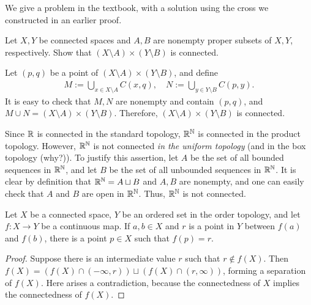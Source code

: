 We give a problem in the textbook, with a solution using the cross we constructed in an earlier proof.
\begin{prob}
    Let $X, Y$ be connected spaces and $A, B$ are nonempty proper subsets of $X, Y$, respectively.
    Show that $(X\setminus A)\times(Y\setminus B)$ is connected.
\end{prob}
\begin{sol}
    Let $(p, q)$ be a point of $(X\setminus A)\times(Y\setminus B)$, and define
    \begin{align*}
        M:=\bigcup_{x\in X\setminus A}C(x, q),\quad N:=\bigcup_{y\in Y\setminus B}C(p, y).
    \end{align*}
    It is easy to check that $M, N$ are nonempty and contain $(p, q)$, and $M\cup N=(X\setminus A)\times(Y\setminus B)$.
    Therefore, $(X\setminus A)\times(Y\setminus B)$ is connected.
\end{sol}

\begin{exmp}
    Since ${\mathbb{R}}$ is connected in the standard topology, ${\mathbb{R}}^{\mathbb{N}}$ is connected in the product topology.
    However, ${\mathbb{R}}^{\mathbb{N}}$ is not connected \textit{in the uniform topology} (and in the box topology \color{brown}(why?)\color{black}).
    To justify this assertion, let $A$ be the set of all bounded sequences in ${\mathbb{R}}^{\mathbb{N}}$, and let $B$ be the set of all unbounded sequences in ${\mathbb{R}}^{\mathbb{N}}$.
    It is clear by definition that ${\mathbb{R}}^{\mathbb{N}}=A\sqcup B$ and $A, B$ are nonempty, and one can easily check that $A$ and $B$ are open in ${\mathbb{R}}^{\mathbb{N}}$.
    Thus, ${\mathbb{R}}^{\mathbb{N}}$ is not connected.
\end{exmp}

\begin{thm}
    Let $X$ be a connected space, $Y$ be an ordered set in the order topology, and let $f: X\rightarrow Y$ be a continuous map.
    If $a, b\in X$ and $r$ is a point in $Y$ between $f(a)$ and $f(b)$, there is a point $p\in X$ such that $f(p)=r$.
\end{thm}
\begin{proof}
    Suppose there is an intermediate value $r$ such that $r\notin f(X)$.
    Then $f(X)=(f(X)\cap (-\infty, r))\sqcup(f(X)\cap(r, \infty))$, forming a separation of $f(X)$.
    Here arises a contradiction, because the connectedness of $X$ implies the connectedness of $f(X)$.
\end{proof}

